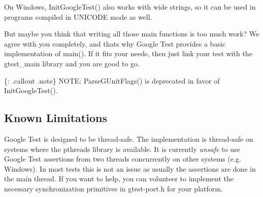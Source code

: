 On Windows, {\ttfamily Init\+Google\+Test()} also works with wide strings, so it can be used in programs compiled in {\ttfamily U\+N\+I\+C\+O\+DE} mode as well.

But maybe you think that writing all those {\ttfamily main} functions is too much work? We agree with you completely, and that\textquotesingle{}s why Google Test provides a basic implementation of main(). If it fits your needs, then just link your test with the {\ttfamily gtest\+\_\+main} library and you are good to go.

\{\+: .callout .note\} N\+O\+TE\+: {\ttfamily Parse\+G\+Unit\+Flags()} is deprecated in favor of {\ttfamily Init\+Google\+Test()}.

\subsection*{Known Limitations}


\begin{DoxyItemize}
\item Google Test is designed to be thread-\/safe. The implementation is thread-\/safe on systems where the {\ttfamily pthreads} library is available. It is currently {\itshape unsafe} to use Google Test assertions from two threads concurrently on other systems (e.\+g. Windows). In most tests this is not an issue as usually the assertions are done in the main thread. If you want to help, you can volunteer to implement the necessary synchronization primitives in {\ttfamily gtest-\/port.\+h} for your platform. 
\end{DoxyItemize}